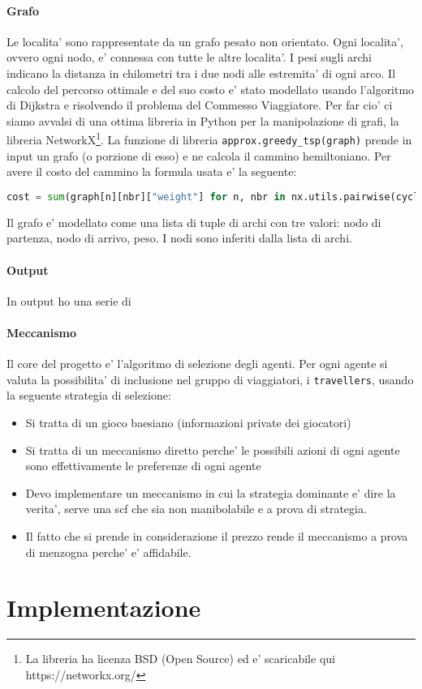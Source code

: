 \documentclass{article}
\begin{document}
\paragraph*{Grafo}
Le localita' sono rappresentate da un grafo pesato non orientato. Ogni localita', ovvero ogni nodo, e' connessa con tutte le altre localita'. I pesi sugli archi indicano la distanza in chilometri tra i due nodi alle estremita' di ogni arco. 
Il calcolo del percorso ottimale e del suo costo e' stato modellato usando l'algoritmo di Dijkstra e risolvendo il problema del Commesso Viaggiatore. Per far cio' ci siamo avvalsi di una ottima libreria in Python per la manipolazione di grafi, la libreria NetworkX\footnote{La libreria ha licenza BSD (Open Source) ed e' scaricabile qui https://networkx.org/}. La funzione di libreria \verb|approx.greedy_tsp(graph)| prende in input un grafo (o porzione di esso) e ne calcola il cammino hemiltoniano.
Per avere il costo del cammino la formula usata e' la seguente:
\begin{lstlisting}[language=Python]
cost = sum(graph[n][nbr]["weight"] for n, nbr in nx.utils.pairwise(cycle))
\end{lstlisting}
Il grafo e' modellato come una lista di tuple di archi con tre valori: nodo di partenza, nodo di arrivo, peso. 
I nodi sono inferiti dalla lista di archi. 

\paragraph*{Output}
In output ho una serie di 
\paragraph*{Meccanismo}
Il core del progetto e' l'algoritmo di selezione degli agenti. Per ogni agente si valuta la possibilita' di inclusione nel gruppo di viaggiatori, i \verb|travellers|, usando la seguente strategia di selezione:
 \begin{itemize}
   \item Si tratta di un gioco baesiano (informazioni private dei giocatori)
   \item Si tratta di un meccanismo diretto perche' le possibili azioni di ogni agente sono effettivamente le preferenze di ogni agente
   \item Devo implementare un meccanismo in cui la strategia dominante e' dire la verita', serve una scf che sia non manibolabile e a prova di strategia.
   \item Il fatto che si prende in considerazione il prezzo rende il meccanismo a prova di menzogna perche' e' affidabile. 
 \end{itemize}


\paragraph*{}

\paragraph*{}
\clearpage
\pagebreak
\section*{Implementazione}

\end{document}
